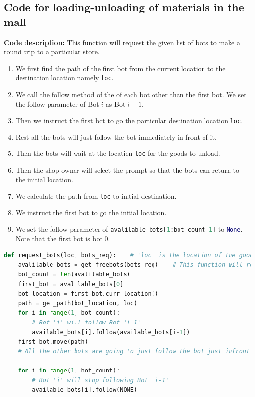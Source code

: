 \documentclass{article}
\begin{document}
\subsection{Code for loading-unloading of materials in the mall}
\label{code:e}
\textbf{Code description: } 
This function will request the given list of bots to make a round trip to a particular store.
\begin{enumerate}
\item We first find the path of the first bot from the current location to the destination location namely \lstinline[language=Python]{loc}.
\item We call the follow method of the of each bot other than the first bot. We set the follow parameter of Bot $i$ as Bot $i-1$.
\item Then we instruct the first bot to go the particular destination location \lstinline[language=Python]{loc}.
\item Rest all the bots will just follow the bot immediately in front of it.
\item Then the bots will wait at the location \lstinline[language=Python]{loc} for the goods to unload.
\item Then the shop owner will select the prompt so that the bots can return to the initial location.
\item We calculate the path from \lstinline[language=Python]{loc} to initial destination.
\item We instruct the first bot to go the initial location.
\item We set the follow parameter of \lstinline[language=Python]{avalilable_bots[1:bot_count-1]} to \lstinline[language=Python]{None}. Note that the first bot is bot $0$.
\end{enumerate}
\begin{lstlisting}[language=Python, caption=Round Trip of bot-Part 1]
def request_bots(loc, bots_req):	# 'loc' is the location of the goods that the bots have to carry
	avalilable_bots = get_freebots(bots_req)	# This function will return a list of bots_req number of available bots
	bot_count = len(avalilable_bots)
	first_bot = avalilable_bots[0]
	bot_location = first_bot.curr_location()
	path = get_path(bot_location, loc)
	for i in range(1, bot_count):
		# Bot 'i' will follow Bot 'i-1'
		available_bots[i].follow(available_bots[i-1])		
	first_bot.move(path)
	# All the other bots are going to just follow the bot just infront of it so all the bots will reach the destination.

	for i in range(1, bot_count):
		# Bot 'i' will stop following Bot 'i-1'
		available_bots[i].follow(NONE)	
		
\end{lstlisting}
\end{document}
